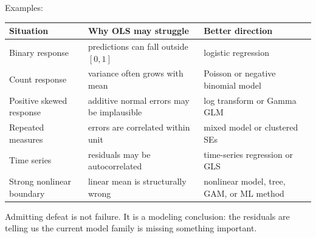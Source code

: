 Examples:
\begin{center}
\begin{tabular}{p{}p{}p{}}
\toprule
Situation & Why OLS may struggle & Better direction \\
\midrule
Binary response & predictions can fall outside \([0,1]\) & logistic regression \\
Count response & variance often grows with mean & Poisson or negative binomial model \\
Positive skewed response & additive normal errors may be implausible & log transform or Gamma GLM \\
Repeated measures & errors are correlated within unit & mixed model or clustered SEs \\
Time series & residuals may be autocorrelated & time-series regression or GLS \\
Strong nonlinear boundary & linear mean is structurally wrong & nonlinear model, tree, GAM, or ML method \\
\bottomrule
\end{tabular}
\end{center}

Admitting defeat is not failure.  It is a modeling conclusion: the residuals are telling us the current model family is missing something important.

